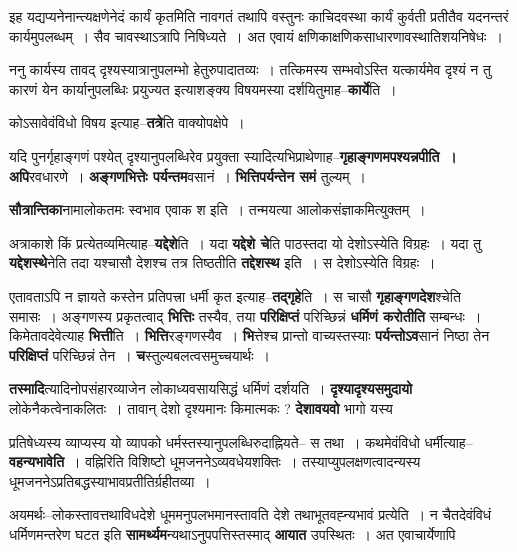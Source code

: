 \documentclass[article,12pt,a4paper]{memoir}
\begin{document}
	  \pstart इह यद्यप्यनेनान्त्यक्षणेनेदं कार्यं कृतमिति नावगतं तथापि वस्तुनः काचिदवस्था कार्यं कुर्वती प्रतीतैव यदनन्तरं कार्यमुपलब्धम् । सैव चावस्थाऽत्रापि निषिध्यते । अत एवायं क्षणिकाक्षणिकसाधारणावस्थातिशयनिषेधः ।
	\pend
      

	  \pstart ननु कार्यस्य ता\leavevmode{}वद् दृश्यस्यात्रानुपलम्भो हेतुरुपादातव्यः । तत्किमस्य सम्भवोऽस्ति यत्कार्यमेव दृश्यं न तु कारणं येन कार्यानुपलब्धिः प्रयुज्यत इत्याशङ्क्य विषयमस्या दर्शयितुमाह--\textbf{कार्ये}ति ।
	\pend
      

	  \pstart कोऽसावेवंविधो विषय इत्याह--\textbf{तत्रे}ति वाक्योपक्षेपे ।
	\pend
      

	  \pstart यदि पुनर्गृहाङ्गणं पश्येत् दृश्यानुपलब्धिरेव प्रयुक्ता स्यादित्यभिप्राथेणाह--\textbf{गृहाङ्गणमपश्यन्नपीति । अपि}रवधारणे । \textbf{अङ्गणभित्तेः पर्यन्तम}वसानं । \textbf{भित्तिपर्यन्तेन समं} तुल्यम् ।
	\pend
      

	  \pstart \textbf{सौत्रान्तिका}नामालोकतमः स्वभाव एवाक श इति । तन्मयत्या आलोकसंज्ञाकमित्युक्तम् ।
	\pend
      

	  \pstart अत्राकाशे किं प्रत्येतव्यमित्याह--\textbf{यद्देशे}ति । यदा \textbf{यद्देशे चे}ति पाठस्तदा यो देशोऽस्येति विग्रहः । यदा तु \textbf{यद्देशस्थे}नेति तदा यश्चासौ देशश्च तत्र तिष्ठतीति \textbf{तद्देशस्थ} इति । स देशोऽस्येति विग्रहः ।
	\pend
      

	  \pstart एतावताऽपि न ज्ञायते कस्तेन प्रतिपत्त्रा धर्मी कृत इत्याह--\textbf{तद्गृहे}ति । स चासौ \textbf{गृहाङ्गणदेश}श्चेति समासः । अङ्गणस्य प्रकृतत्वाद् \textbf{भित्तिः} तस्यैव, तया \textbf{परिक्षिप्तं} परिच्छिन्नं \textbf{धर्मिणं करोतीति} सम्बन्धः । किमेतावदेवेत्याह \textbf{भित्ती}ति । \textbf{भित्ति}रङ्गणस्यैव । \textbf{भि}त्तेश्च प्रान्तो वाच्यस्तस्याः \textbf{पर्यन्तोऽव}सानं निष्ठा तेन \textbf{परिक्षिप्तं} परिच्छिन्नं तेन । \textbf{च}स्तुल्यबलत्वसमुच्चयार्थः ।
	\pend
      

	  \pstart \textbf{तस्मादि}त्यादिनोपसंहारव्याजेन लोकाध्यवसायसिद्धं धर्मिणं दर्शयति । \textbf{दृश्यादृश्यसमुदायो} लोकेनैकत्वेनाकलितः । तावान् देशो दृश्यमानः किमात्मकः ? \textbf{देशावयवो} भागो यस्य  \leavevmode{} 
	  
	प्रतिषेध्यस्य व्याप्यस्य यो व्यापको धर्मस्तस्यानुपलब्धिरुदाह्नियते-- स तथा । कथमेवंविधो धर्मीत्याह--\textbf{वहन्यभावेति} । वह्निरिति विशिष्टो धूमजननेऽव्यवधेयशक्तिः । तस्याप्युपलक्षणत्वादन्यस्य धूमजननेऽप्रतिबद्धस्याभावप्रतीतिर्ग्रहीतव्या ।
	\pend
      

	  \pstart अयमर्थः--लोकस्तावत्तथाविधदेशे धूममनुपलभमानस्तावति देशे तथाभूतवह्न्यभावं प्रत्येति । न चैतदेवंविधं धर्मिणमन्तरेण घटत इति \textbf{सामर्थ्यम}न्यथाऽनुपपत्तिस्तस्माद् \textbf{आयात} उपस्थितः । अत एवाचार्येणापि 
	    \pend
	  
\end{document}
